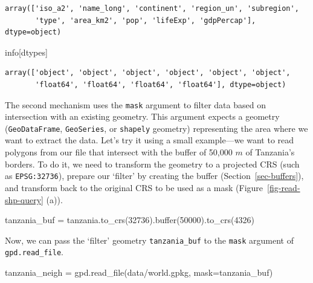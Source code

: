 \documentclass[
  letterpaper,
]{krantz}
\newenvironment{Shaded}{\begin{snugshade}}{\end{snugshade}}
\newcommand{\BuiltInTok}[1]{\textcolor[rgb]{0.00,0.23,0.31}{#1}}
\newcommand{\DecValTok}[1]{\textcolor[rgb]{0.68,0.00,0.00}{#1}}
\newcommand{\NormalTok}[1]{\textcolor[rgb]{0.00,0.23,0.31}{#1}}
\newcommand{\OperatorTok}[1]{\textcolor[rgb]{0.37,0.37,0.37}{#1}}
\newcommand{\StringTok}[1]{\textcolor[rgb]{0.13,0.47,0.30}{#1}}
\begin{document}
\begin{verbatim}
array(['iso_a2', 'name_long', 'continent', 'region_un', 'subregion',
       'type', 'area_km2', 'pop', 'lifeExp', 'gdpPercap'], dtype=object)
\end{verbatim}

\begin{Shaded}
\begin{Highlighting}[]
\NormalTok{info[}\StringTok{\textquotesingle{}dtypes\textquotesingle{}}\NormalTok{]}
\end{Highlighting}
\end{Shaded}

\begin{verbatim}
array(['object', 'object', 'object', 'object', 'object', 'object',
       'float64', 'float64', 'float64', 'float64'], dtype=object)
\end{verbatim}

The second mechanism uses the \texttt{mask} argument to filter data
based on intersection with an existing geometry. This argument expects a
geometry (\texttt{GeoDataFrame}, \texttt{GeoSeries}, or \texttt{shapely}
geometry) representing the area where we want to extract the data. Let's
try it using a small example---we want to read polygons from our file
that intersect with the buffer of 50,000 \(m\) of Tanzania's borders. To
do it, we need to transform the geometry to a projected CRS (such as
\texttt{EPSG:32736}), prepare our `filter' by creating the buffer
(Section~\ref{sec-buffers}), and transform back to the original CRS to
be used as a mask (Figure~\ref{fig-read-shp-query} (a)).

\begin{Shaded}
\begin{Highlighting}[]
\NormalTok{tanzania\_buf }\OperatorTok{=}\NormalTok{ tanzania.to\_crs(}\DecValTok{32736}\NormalTok{).}\BuiltInTok{buffer}\NormalTok{(}\DecValTok{50000}\NormalTok{).to\_crs(}\DecValTok{4326}\NormalTok{)}
\end{Highlighting}
\end{Shaded}

Now, we can pass the `filter' geometry \texttt{tanzania\_buf} to the
\texttt{mask} argument of \texttt{gpd.read\_file}.

\begin{Shaded}
\begin{Highlighting}[]
\NormalTok{tanzania\_neigh }\OperatorTok{=}\NormalTok{ gpd.read\_file(}\StringTok{\textquotesingle{}data/world.gpkg\textquotesingle{}}\NormalTok{, mask}\OperatorTok{=}\NormalTok{tanzania\_buf)}
\end{Highlighting}
\end{Shaded}
\end{document}

